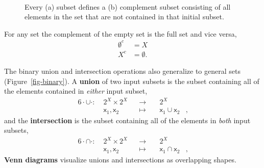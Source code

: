 \documentclass[
  letterpaper,
  DIV=11,
  numbers=noendperiod]{scrartcl}
\begin{document}
\begin{figure}
\begin{minipage}[t]{0.45\linewidth}
{{}

}

\subcaption{\label{fig-complement}}
\end{minipage}%
%
\begin{minipage}[t]{0.05\linewidth}

{\centering 

~

}

\end{minipage}%

\caption{\label{fig-unary}Every (a) subset defines a (b) complement
subset consisting of all elements in the set that are not contained in
that initial subset.}

\end{figure}

For any set the complement of the empty set is the full set and vice
versa, \begin{align*}
\emptyset^{c} &= X
\\
X^{c} &= \emptyset.
\end{align*}

The binary union and intersection operations also generalize to general
sets (Figure~\ref{fig-binary}). A \textbf{union} of two input subsets is
the subset containing all of the elements contained in \emph{either}
input subset, \begin{alignat*}{6}
\cdot \cup \cdot :\; & 2^{X} \times 2^{X}& &\rightarrow& \; & 2^{X} &
\\
& \mathsf{x}_1, \mathsf{x}_{2} & &\mapsto& & \mathsf{x}_1 \cup \mathsf{x}_2 &,
\end{alignat*} and the \textbf{intersection} is the subset containing
all of the elements in \emph{both} input subsets, \begin{alignat*}{6}
\cdot \cap \cdot :\; & 2^{X} \times 2^{X}& &\rightarrow& \; & 2^{X} &
\\
& \mathsf{x}_1, \mathsf{x}_{2} & &\mapsto& & \mathsf{x}_1 \cap \mathsf{x}_2 &,
\end{alignat*} \textbf{Venn diagrams} visualize unions and intersections
as overlapping shapes.
\end{document}
